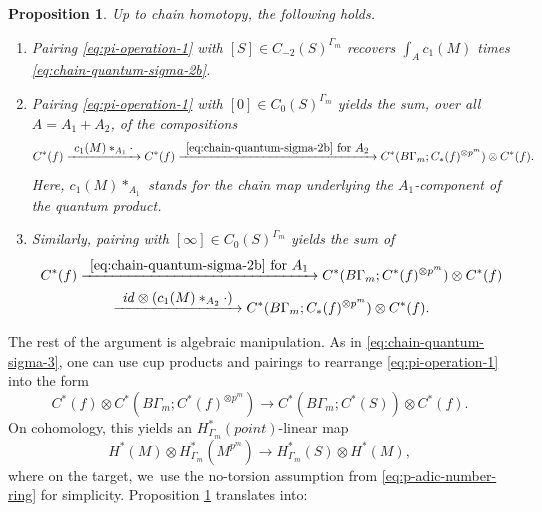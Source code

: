 \documentclass[JEP,XML,SOM,Unicode,NoFloatCountersInSection,published]{cedram}
\newcommand\To[1]{\mathchoice{\xrightarrow{\textstyle\kern4pt#1\kern3pt}}{\stackrel{#1}{\longrightarrow}}{}{}}
\theoremstyle{plain}
\newtheorem{proposition}[theorem]{Proposition}
\theoremstyle{definition}
\begin{document}
\begin{proposition} \label{th:extra-point}
Up to chain homotopy, the following holds.
\begin{enumerate}
\item
Pairing \eqref{eq:pi-operation-1} with $[S] \in C_{-2}(S)^{\Gamma_m}$ recovers $\int_A c_1(M)$ times \eqref{eq:chain-quantum-sigma-2b}.

\item
Pairing \eqref{eq:pi-operation-1} with $[0] \in C_0(S)^{\Gamma_m}$ yields the sum, over all $A = A_1+A_2$, of the compositions
\begin{equation*}
C^*(f) \To{c_1(M) \ast_{A_1} \cdot} C^*(f) \To{\text{\eqref{eq:chain-quantum-sigma-2b} for } A_2} C^*(B\Gamma_m;C_*(f)^{\otimes p^m}) \otimes C^*(f).
\end{equation*}
Here, $c_1(M) \ast_{A_1}$ stands for the chain map underlying the $A_1$-component of the quantum product.

\item
Similarly, pairing with $[\infty] \in C_0(S)^{\Gamma_m}$ yields the sum of
\begin{multline*}
C^*(f) \To{\text{\eqref{eq:chain-quantum-sigma-2b} for } A_1} C^*(B\Gamma_m;C^*(f)^{\otimes p^m}) \otimes C^*(f)
\\
\To{\mathit{id} \otimes (c_1(M) \ast_{A_2} \cdot)}
C^*(B\Gamma_m;C_*(f)^{\otimes p^m}) \otimes C^*(f).
\end{multline*}
\end{enumerate}
\end{proposition}

The rest of the argument is algebraic manipulation. As in \eqref{eq:chain-quantum-sigma-3}, one can use cup products and pairings to rearrange \eqref{eq:pi-operation-1} into the form
\begin{equation*}
C^*(f) \otimes C^*(B\Gamma_m; C^*(f)^{\otimes p^m}) \to
C^*(B\Gamma_m; C^*(S)) \otimes C^*(f).
\end{equation*}
On cohomology, this yields an $H^*_{\Gamma_m}(\mathit{point})$-linear map
\begin{equation}\label{eq:pi-operation-3}
H^*(M) \otimes H^*_{\Gamma_m}(M^{p^m}) \to H^*_{\Gamma_m}(S) \otimes H^*(M),
\end{equation}
where on the target, we~use the no-torsion assumption from \eqref{eq:p-adic-number-ring} for simplicity. Proposition \ref{th:extra-point} translates into:
\end{document}
